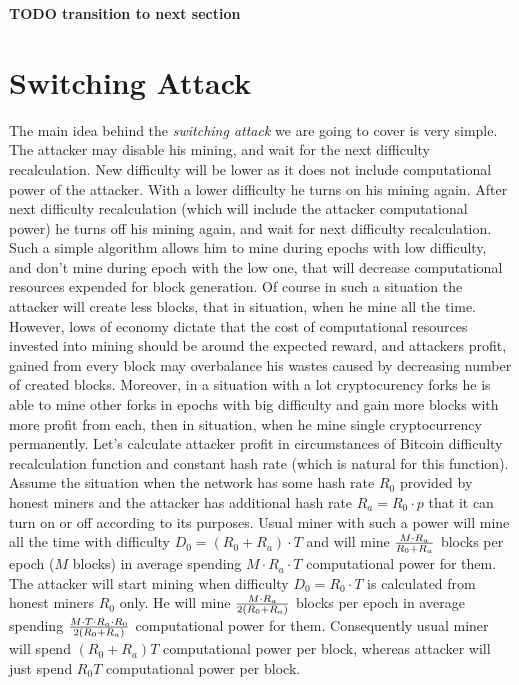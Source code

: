 \documentclass[number,preprint,review]{elsarticle}
\begin{document}
\textbf{TODO transition to next section}

\section{Switching Attack}
\label{sec:attack}

The main idea behind the \textit{switching attack} we are going to cover is very simple.
The attacker may disable his mining, and wait for the next difficulty recalculation.
New difficulty will be lower as it does not include computational power of the attacker. With a lower difficulty he turns on his mining again.
After next difficulty recalculation (which will include the attacker computational power) he turns off his mining again, and wait for next difficulty recalculation.
Such a simple algorithm allows him to mine during epochs with low difficulty, and don't mine during epoch with the low one, that will decrease computational resources expended for block generation.
Of course in such a situation the attacker will create less blocks, that in situation, when he mine all the time.
However, lows of economy dictate that the cost of computational resources invested into mining should be around the expected reward, and attackers profit, gained from every block may overbalance his wastes caused by decreasing number of created blocks.
Moreover, in a situation with a lot cryptocurency forks he is able to mine other forks in epochs with big difficulty and gain more blocks with more profit from each, then in situation, when he mine single cryptocurrency permanently.
Let's calculate attacker profit in circumstances of Bitcoin difficulty recalculation function and constant hash rate (which is natural for this function).
Assume the situation when the network has some hash rate \(R_0\) provided by honest miners and the attacker has additional hash rate \(R_a=R_0\cdot p\) that it can turn on or off according to its purposes.
Usual miner with such a power will mine all the time with difficulty \(D_0=(R_0+R_a)\cdot T\) and will mine \(M\cdot R_a\over R_0+R_a\) blocks per epoch (\(M\) blocks) in average spending \(M\cdot R_a\cdot T\) computational power for them.
The attacker will start mining when difficulty \(D_0=R_0\cdot T\) is calculated from honest miners \(R_0\) only.
He will mine \(M\cdot R_a\over 2(R_0+R_a)\) blocks per epoch in average spending \(M\cdot T\cdot R_a\cdot R_0\over 2(R_0+R_a)\) computational power for them.
Consequently usual miner will spend \((R_0+R_a)T\) computational power per block, whereas attacker will just spend \(R_0T\) computational power per block.
\end{document}
